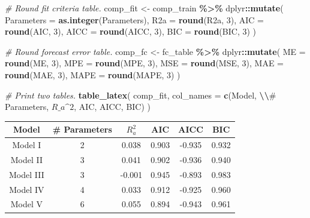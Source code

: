 \documentclass[
  10pt,
]{extarticle}
\newenvironment{Shaded}{\begin{snugshade}}{\end{snugshade}}
\newcommand{\AttributeTok}[1]{\textcolor[rgb]{0.13,0.29,0.53}{#1}}
\newcommand{\CommentTok}[1]{\textcolor[rgb]{0.56,0.35,0.01}{\textit{#1}}}
\newcommand{\DecValTok}[1]{\textcolor[rgb]{0.00,0.00,0.81}{#1}}
\newcommand{\FunctionTok}[1]{\textcolor[rgb]{0.13,0.29,0.53}{\textbf{#1}}}
\newcommand{\NormalTok}[1]{#1}
\newcommand{\OtherTok}[1]{\textcolor[rgb]{0.56,0.35,0.01}{#1}}
\newcommand{\SpecialCharTok}[1]{\textcolor[rgb]{0.81,0.36,0.00}{\textbf{#1}}}
\newcommand{\StringTok}[1]{\textcolor[rgb]{0.31,0.60,0.02}{#1}}
\begin{document}
\begin{Shaded}
\begin{Highlighting}[]
\CommentTok{\# Round fit criteria table.}
\NormalTok{comp\_fit }\OtherTok{\textless{}{-}}\NormalTok{ comp\_train }\SpecialCharTok{\%\textgreater{}\%}
\NormalTok{  dplyr}\SpecialCharTok{::}\FunctionTok{mutate}\NormalTok{(}
    \AttributeTok{Parameters =} \FunctionTok{as.integer}\NormalTok{(Parameters),}
    \AttributeTok{R2a =} \FunctionTok{round}\NormalTok{(R2a, }\DecValTok{3}\NormalTok{),}
    \AttributeTok{AIC =} \FunctionTok{round}\NormalTok{(AIC, }\DecValTok{3}\NormalTok{),}
    \AttributeTok{AICC =} \FunctionTok{round}\NormalTok{(AICC, }\DecValTok{3}\NormalTok{),}
    \AttributeTok{BIC =} \FunctionTok{round}\NormalTok{(BIC, }\DecValTok{3}\NormalTok{)}
\NormalTok{  )}

\CommentTok{\# Round forecast error table.}
\NormalTok{comp\_fc }\OtherTok{\textless{}{-}}\NormalTok{ fc\_table }\SpecialCharTok{\%\textgreater{}\%}
\NormalTok{  dplyr}\SpecialCharTok{::}\FunctionTok{mutate}\NormalTok{(}
    \AttributeTok{ME =} \FunctionTok{round}\NormalTok{(ME, }\DecValTok{3}\NormalTok{),}
    \AttributeTok{MPE =} \FunctionTok{round}\NormalTok{(MPE, }\DecValTok{3}\NormalTok{),}
    \AttributeTok{MSE =} \FunctionTok{round}\NormalTok{(MSE, }\DecValTok{3}\NormalTok{),}
    \AttributeTok{MAE =} \FunctionTok{round}\NormalTok{(MAE, }\DecValTok{3}\NormalTok{),}
    \AttributeTok{MAPE =} \FunctionTok{round}\NormalTok{(MAPE, }\DecValTok{3}\NormalTok{)}
\NormalTok{  )}

\CommentTok{\# Print two tables.}
\FunctionTok{table\_latex}\NormalTok{(}
\NormalTok{  comp\_fit,}
  \AttributeTok{col\_names =} \FunctionTok{c}\NormalTok{(}\StringTok{\textquotesingle{}Model\textquotesingle{}}\NormalTok{, }\StringTok{\textquotesingle{}}\SpecialCharTok{\textbackslash{}\textbackslash{}}\StringTok{\# Parameters\textquotesingle{}}\NormalTok{, }\StringTok{\textquotesingle{}$R\_a\^{}2$\textquotesingle{}}\NormalTok{, }\StringTok{\textquotesingle{}AIC\textquotesingle{}}\NormalTok{, }\StringTok{\textquotesingle{}AICC\textquotesingle{}}\NormalTok{, }\StringTok{\textquotesingle{}BIC\textquotesingle{}}\NormalTok{)}
\NormalTok{)}
\end{Highlighting}
\end{Shaded}

\begin{table}[H]
\centering
\begin{tabular}{cccccc}
\toprule
Model & \# Parameters & $R_a^2$ & AIC & AICC & BIC\\
\midrule
Model I & 2 & 0.038 & 0.903 & -0.935 & 0.932\\
Model II & 3 & 0.041 & 0.902 & -0.936 & 0.940\\
Model III & 3 & -0.001 & 0.945 & -0.893 & 0.983\\
Model IV & 4 & 0.033 & 0.912 & -0.925 & 0.960\\
Model V & 6 & 0.055 & 0.894 & -0.943 & 0.961\\
\bottomrule
\end{tabular}
\end{table}
\end{document}
